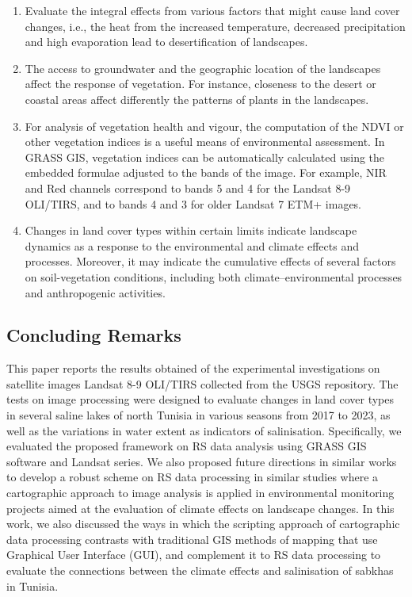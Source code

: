 \documentclass[land,article,accept,pdftex,moreauthors]{Definitions/mdpi}
\begin{document}
\begin{enumerate}
	\item Evaluate the integral effects from various factors that {might cause land cover} changes, i.e., the heat from the increased temperature, decreased precipitation and high evaporation lead to desertification of landscapes. 
	\item The access to groundwater and the geographic location of the landscapes affect the {response of} vegetation. For instance, closeness to the desert or coastal areas affect differently{ the patterns of plants in the} landscapes. 
	\item For analysis of vegetation health and vigour, the computation of the NDVI or other vegetation indices is a useful means of environmental assessment. In GRASS GIS, vegetation indices can be automatically calculated {using} the embedded formulae adjusted to the bands of the {image}. For example, NIR and Red channels correspond to bands 5 and 4 for the Landsat 8-9 OLI/TIRS, and to bands 4 and 3 for older Landsat 7 ETM+ images.
	\item Changes in land cover types within certain limits indicate {landscape} dynamics as a response to the environmental and climate effects and processes. Moreover, it may indicate the cumulative effects of several factors on soil-vegetation conditions, including both climate--environmental processes and anthropogenic activities.
\end{enumerate}

\subsection{Concluding Remarks}

This paper reports the results obtained {of the} experimental investigations on satellite images Landsat 8-9 OLI/TIRS collected from the USGS {repository}. The tests on image processing were designed to evaluate{ changes in land cover types} in several saline lakes of north Tunisia in various seasons from {2017} to 2023{, as well as the }variations in water extent as indicators of salinisation. Specifically, we evaluated the proposed framework on RS data analysis using GRASS GIS software and {Landsat} series. We also proposed future directions in similar works to develop a robust scheme on RS data processing{ in} similar studies where a cartographic approach to image analysis is applied in environmental monitoring projects aimed at the evaluation of climate effects on landscape changes. In this work{, }we also discussed the ways in which the{ scripting} approach of cartographic data processing contrasts with traditional GIS methods of mapping that use Graphical User Interface (GUI), and complement it to RS data processing to evaluate the connections between the climate effects and salinisation of sabkhas in Tunisia. 
\end{document}
